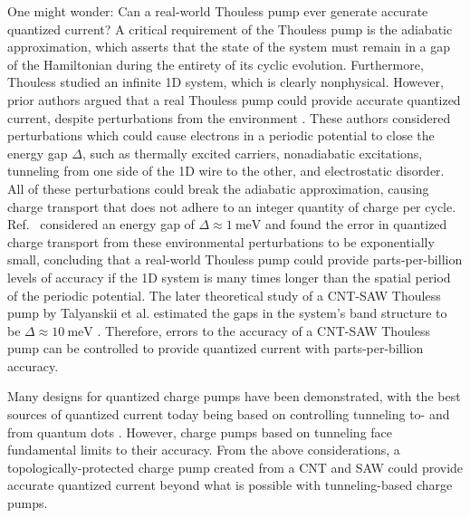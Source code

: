\documentclass[double,12pt,1in,seploa]{beavtex}
\begin{document}
One might wonder: Can a real-world Thouless pump ever generate accurate quantized current? A critical requirement of the Thouless pump is the adiabatic approximation, which asserts that the state of the system must remain in a gap of the Hamiltonian during the entirety of its cyclic evolution. Furthermore, Thouless studied an infinite 1D system, which is clearly nonphysical. However, prior authors argued that a real Thouless pump could provide accurate quantized current, despite perturbations from the environment \cite{niu_towards_1990, niu_quantised_1984}. These authors considered perturbations which could cause electrons in a periodic potential to close the energy gap $\Delta$, such as thermally excited carriers, nonadiabatic excitations, tunneling from one side of the 1D wire to the other, and electrostatic disorder. All of these perturbations could break the adiabatic approximation, causing charge transport that does not adhere to an integer quantity of charge per cycle. Ref.\ \cite{niu_towards_1990} considered an energy gap of $\Delta \approx \SI{1}{\milli\electronvolt}$ and found the error in quantized charge transport from these environmental perturbations to be exponentially small, concluding that a real-world Thouless pump could provide parts-per-billion levels of accuracy if the 1D system is many times longer than the spatial period of the periodic potential. The later theoretical study of a CNT-SAW Thouless pump by Talyanskii et al. estimated the gaps in the system's band structure to be $\Delta \approx \SI{10}{\milli\electronvolt}$ \cite{talyanskii_quantized_2001}. Therefore, errors to the accuracy of a CNT-SAW Thouless pump can be controlled to provide quantized current with parts-per-billion accuracy. 

Many designs for quantized charge pumps have been demonstrated, with the best sources of quantized current today being based on controlling tunneling to- and from quantum dots \cite{scherer_singleelectron_2019}. However, charge pumps based on tunneling face fundamental limits to their accuracy. From the above considerations, a topologically-protected charge pump created from a CNT and SAW could provide accurate quantized current beyond what is possible with tunneling-based charge pumps.

\end{document}
